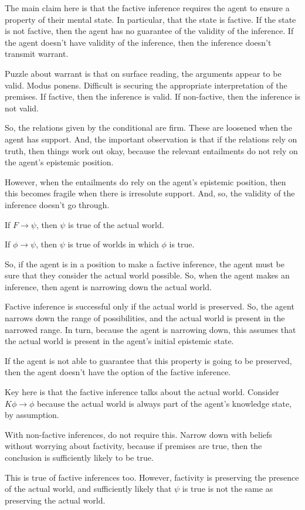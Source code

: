 \documentclass[10pt]{article}
\begin{document}
\begin{note}
  The main claim here is that the factive inference requires the agent to ensure a property of their mental state.
  In particular, that the state is factive.
  If the state is not factive, then the agent has no guarantee of the validity of the inference.
  If the agent doesn't have validity of the inference, then the inference doesn't transmit warrant.

  Puzzle about warrant is that on surface reading, the arguments appear to be valid.
  Modus ponens.
  Difficult is securing the appropriate interpretation of the premises.
  If factive, then the inference is valid.
  If non-factive, then the inference is not valid.

  So, the relations given by the conditional are firm.
  These are loosened when the agent has support.
  And, the important observation is that if the relations rely on truth, then things work out okay, because the relevant entailments do not rely on the agent's epistemic position.

  However, when the entailments do rely on the agent's epistemic position, then this becomes fragile when there is irresolute support.
  And, so, the validity of the inference doesn't go through.
\end{note}

\begin{note}
  If \(F \rightarrow \psi\), then \(\psi\) is true of the actual world.

  If \(\phi \rightarrow \psi\), then \(\psi\) is true of worlds in which \(\phi\) is true.

  So, if the agent is in a position to make a factive inference, the agent must be sure that they consider the actual world possible.
  So, when the agent makes an inference, then agent is narrowing down the actual world.

  Factive inference is successful only if the actual world is preserved.
  So, the agent narrows down the range of possibilities, and the actual world is present in the narrowed range.
  In turn, because the agent is narrowing down, this assumes that the actual world is present in the agent's initial epistemic state.

  If the agent is not able to guarantee that this property is going to be preserved, then the agent doesn't have the option of the factive inference.

  Key here is that the factive inference talks about the actual world.
  Consider \(K\phi \rightarrow \phi\) because the actual world is always part of the agent's knowledge state, by assumption.

  With non-factive inferences, do not require this.
  Narrow down with beliefs without worrying about factivity, because if premises are true, then the conclusion is sufficiently likely to be true.

  This is true of factive inferences too.
  However, factivity is preserving the presence of the actual world, and sufficiently likely that \(\psi\) is true is not the same as preserving the actual world.
\end{note}
\end{document}
